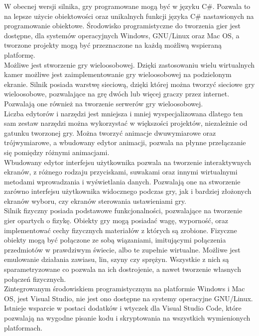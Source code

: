 \documentclass{article} %
\begin{document}
        W obecnej wersji silnika, gry programowane mogą być w języku C\#. Pozwala to na lepsze użycie obiektowości oraz unikalnych funkcji języka C\# nastawionych na programowanie obiektowe. Środowisko programistyczne do tworzenia gier jest dostępne, dla systemów operacyjnych Windows, GNU/Linux oraz Mac OS, a tworzone projekty mogą być przeznaczone na każdą możliwą wspieraną platformę.
        \\
        
        Możliwe jest stworzenie gry wieloosobowej. Dzięki zastosowaniu wielu wirtualnych kamer możliwe jest zaimplementowanie gry wieloosobowej na podzielonym ekranie. Silnik posiada warstwę sieciową, dzięki której można tworzyć sieciowe gry wieloosobowe, pozwalające na grę dwóch lub więcej graczy przez internet. Pozwalają one również na tworzenie serwerów gry wieloosobowej.
        \\
        
        Liczba edytorów i narzędzi jest mniejsza i mniej wyspecjalizowana dlatego ten sam zestaw narzędzi można wykorzystać w większości projektów, niezależnie od gatunku tworzonej gry. Można tworzyć animacje dwuwymiarowe oraz trójwymiarowe, a wbudowany edytor animacji, pozwala na płynne przełączanie się pomiędzy różnymi animacjami.
        \\
        
        Wbudowany edytor interfejsu użytkownika pozwala na tworzenie interaktywnych ekranów, z różnego rodzaju przyciskami, suwakami oraz innymi wirtualnymi metodami wprowadzania i wyświetlania danych. Pozwalają one na stworzenie zarówno interfejsu użytkownika widocznego podczas gry, jak i bardziej złożonych ekranów wyboru, czy ekranów sterowania ustawieniami gry.
        \\
        
        Silnik fizyczny posiada podstawowe funkcjonalności, pozwalające na tworzenie gier opartych o fizykę. Obiekty gry mogą posiadać wagę, wyporność, oraz implementować cechy fizycznych materiałów z których są zrobione. Fizyczne obiekty mogą być połączone ze sobą wiązaniami, imitującymi połączenia przedmiotów w prawdziwym świecie, albo te zupełnie wirtualne. Możliwe jest emulowanie działania zawiasu, lin, szyny czy sprężyn. Wszystkie z nich są sparametryzowane co pozwala na ich dostrojenie, a nawet tworzenie własnych połączeń fizycznych.
        \\
        
        Zintegrowanym środowiskiem programistycznym na platformie Windows i Mac OS, jest Visual Studio, nie jest ono dostępne na systemy operacyjne GNU/Linux. Istnieje wsparcie w postaci dodatków i wtyczek dla Visual Studio Code, które pozwalają na wygodne pisanie kodu i skryptowania na wszystkich wymienionych platformach.
        \\
         
\end{document}

